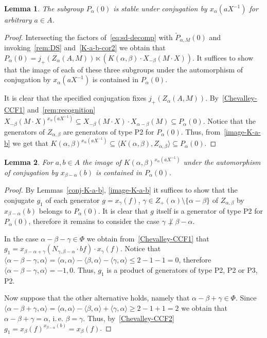 \documentclass[10pt,a4paper,twoside]{article}
\newtheorem{lemma}{Lemma}
\theoremstyle{remark}
\theoremstyle{definition}
\numberwithin{lemma}{section}
\numberwithin{prop}{section}
\numberwithin{corollary}{section}
\numberwithin{externaltheorem}{section}
\numberwithin{equation}{section}
\begin{document}
\begin{lemma} \label{P0_conj} The subgroup $P_\alpha(0)$ is stable under conjugation by $x_\alpha(aX^{-1})$ for arbitrary $a \in A$. \end{lemma}
\begin{proof} 
Intersecting the factors of~\eqref{eq:sd-decomp} with $\widetilde{P}_{\alpha, M}(0)$ and invoking~\cref{rem:DS} and~\cref{K-a-b-cor2} we obtain that $P_{\alpha}(0) =  j_+(Z_\alpha(A, M)) \ltimes \left(K(\alpha, \beta) \cdot X_{-\beta}(M \cdot X)\right).$
It suffices to show that the image of each of these three subgroups under the automorphism of conjugation by $x_\alpha(aX^{-1})$ is contained in $P_\alpha(0)$.

It is clear that the specified conjugation fixes $j_+(Z_\alpha(A, M))$. By~\eqref{Chevalley-CCF1} and~\cref{rem:recognition} 
$X_{-\beta}(M\cdot X)^{x_\alpha(aX^{-1})} \subseteq X_{-\beta}(M\cdot X) \cdot X_{\alpha-\beta}(M) \subseteq P_\alpha(0).$ 
Notice that the generators of $Z_{\alpha,\beta}$ are generators of type P2 for $P_\alpha(0)$.
Thus, from~\cref{image-K-a-b} we get that
$K(\alpha, \beta)^{x_\alpha(aX^{-1})} \subseteq \langle K(\alpha, \beta), Z_{\alpha, \beta} \rangle \subseteq P_\alpha(0)$.
\end{proof}

\begin{lemma} \label{conj-S-a-x-bma} For $a, b\in A$ the image of $K(\alpha,\beta)^{x_\alpha(aX^{-1})}$ under the automorphism of conjugation by $x_{\beta-\alpha}(b)$ is contained in $P_\alpha(0)$. \end{lemma}
\begin{proof} By Lemmas~\ref{conj-K-a-b}, \ref{image-K-a-b} it suffices to show that the conjugate $g_1$ of each generator $g = x_\gamma(f)$, $\gamma \in Z_+(\alpha) \setminus \{ \alpha - \beta \}$ of $Z_{\alpha, \beta}$ by $x_{\beta-\alpha}(b)$ belongs to $P_\alpha(0)$. It is clear that $g$ itself is a generator of type P2 for $P_\alpha(0)$, therefore it remains to consider the case $\gamma\not \perp \beta - \alpha$. 
 
In the case $\alpha - \beta - \gamma \in \Phi$ we obtain from~\eqref{Chevalley-CCF1} that
$g_1 = x_{\beta - \alpha + \gamma} (N_{\gamma, \beta -\alpha}\cdot bf)     \cdot x_{\gamma}(f).$ Notice that $\langle \alpha - \beta - \gamma, \alpha \rangle = \langle \alpha, \alpha \rangle - \langle \beta, \alpha \rangle - \langle \gamma, \alpha \rangle \leq 2 - 1 - 1 = 0$, 
 therefore $\langle \alpha - \beta - \gamma, \alpha \rangle = -1,0$. Thus, $g_1$ is a product of generators of type P2, P2 or P3, P2.

Now suppose that the other alternative holds, namely that $\alpha - \beta + \gamma \in \Phi$.
Since $\langle \alpha - \beta + \gamma, \alpha \rangle = \langle \alpha , \alpha \rangle - \langle \beta, \alpha \rangle + \langle \gamma, \alpha \rangle \geq 2 - 1 + 1 = 2$
we obtain that $\alpha - \beta + \gamma = \alpha$, i.\,e. $\beta=\gamma$. Thus, by~\eqref{Chevalley-CCF2} $g_1 = x_\beta(f)^{x_{\beta-\alpha}(b)} = x_\beta(f)$. \end{proof}
\end{document}
